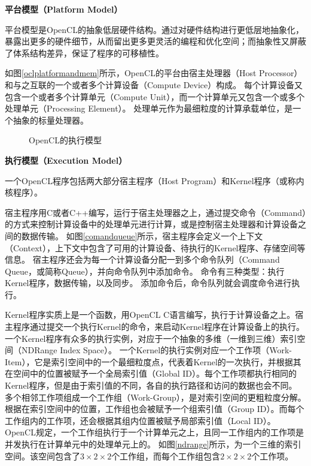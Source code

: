 \begin{compactitem}
\item \textbf{平台模型（Platform Model）}
\end{compactitem}

平台模型是OpenCL的抽象低层硬件结构。通过对硬件结构进行更低层地抽象化，暴露出更多的硬件细节，从而留出更多更灵活的编程和优化空间；而抽象性又屏蔽了体系结构差异，保证了程序的可移植性。

如图\ref{oclplatformandmem}所示，OpenCL的平台由宿主处理器（Host Processor）和与之互联的一个或者多个计算设备（Compute Device）构成。
每个计算设备又包含一个或者多个计算单元（Compute Unit），而一个计算单元又包含一个或多个处理单元（Processing Element）。
处理单元作为最细粒度的计算承载单位，是一个抽象的标量处理器。

\begin{figure}[htb]
  \centering
  \hspace{0.2cm}
  \caption{OpenCL的执行模型}
  \label{oclexecution}
\end{figure}

\begin{compactitem}
\item \textbf{执行模型（Execution Model）}
\end{compactitem}

一个OpenCL程序包括两大部分\pozhehao 宿主程序（Host Program）和Kernel程序（或称内核程序）。

宿主程序用C或者C++编写，运行于宿主处理器之上，通过提交命令（Command）的方式来控制计算设备中的处理单元进行计算，或是控制宿主处理器和计算设备之间的数据传输。
如图\ref{comandqueue}所示，宿主程序会定义一个上下文（Context），上下文中包含了可用的计算设备、待执行的Kernel程序、存储空间等信息。
宿主程序还会为每一个计算设备分配一到多个命令队列（Command Queue，或简称Queue），并向命令队列中添加命令。
命令有三种类型：执行Kernel程序，数据传输，以及同步。
添加命令后，命令队列就会调度命令进行执行。


Kernel程序实质上是一个函数，用OpenCL C语言编写，执行于计算设备之上。宿主程序通过提交一个执行Kernel的命令，来启动Kernel程序在计算设备上的执行。
一个Kernel程序有众多的执行实例，对应于一个抽象的多维（一维到三维）索引空间（NDRange Index Space）。
一个Kernel的执行实例对应一个工作项（Work-Item），它是索引空间中的一个最细粒度点，代表着Kernel的一次执行，并根据其在空间中的位置被赋予一个全局索引值（Global ID）。每个工作项都执行相同的Kernel程序，但是由于索引值的不同，各自的执行路径和访问的数据也会不同。
多个相邻工作项组成一个工作组（Work-Group），是对索引空间的更粗粒度分解。根据在索引空间中的位置，工作组也会被赋予一个组索引值（Group ID）。而每个工作组内的工作项，还会根据其组内位置被赋予局部索引值（Local ID）。
OpenCL规定，一个工作组执行于一个计算单元之上，且同一工作组内的工作项是并发执行在计算单元中的处理单元上的。
如图\ref{ndrange}所示，为一个三维的索引空间。该空间包含了$3\times2\times2$个工作组，而每个工作组包含$2\times2\times2$个工作项。

